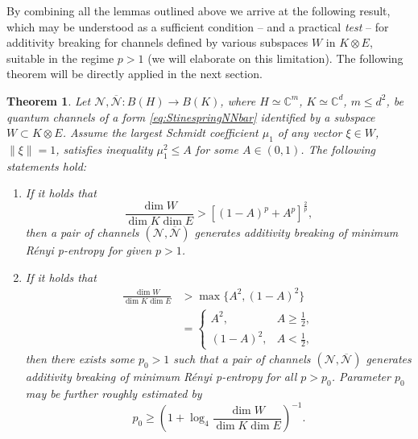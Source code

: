 \documentclass[reqno]{amsart}
\theoremstyle{plain}
\newtheorem{theorem}{Theorem}
\theoremstyle{note}
\newcommand{\complexes}{\mathbb{C}}
\begin{document}
By combining all the lemmas outlined above we arrive at the following result, which may be understood as a sufficient condition -- and a practical \emph{test} -- for additivity breaking for channels defined by various subspaces $W$ in $K \otimes E$, suitable in the regime $p > 1$ (we will elaborate on this limitation). The following theorem will be directly applied in the next section.

\begin{theorem}\label{thm:TheTheorem2}
Let $\mathcal{N}, \overline{\mathcal{N}} : B(H) \to B(K)$, where $H\simeq\complexes^m$, $K\simeq\complexes^d$, $m\leqslant d^2$, be quantum channels of a form \eqref{eq:StinespringNNbar} identified by a subspace $W\subset K \otimes E$. Assume the largest Schmidt coefficient $\mu_1$ of any vector $\xi \in W$, $\| \xi \| = 1$, satisfies inequality $\mu_{1}^{2} \leqslant A$ for some $A \in (0,1)$. The following statements hold:
\begin{enumerate}
    \item \label{item:TheTheorem2item1} If it holds that
\begin{equation}\label{eq:BreakingInequality}
    \frac{\dim{W}}{\dim{K}\dim{E}} > \left[ (1-A)^p + A^p \right]^{\frac{2}{p}},
\end{equation}
then a pair of channels $(\mathcal{N},\overline{\mathcal{N}})$ generates additivity breaking of minimum R\'{e}nyi \textit{p}-entropy for given $p > 1$.
\item \label{item:TheTheorem2item2} If it holds that
\begin{align}\label{eq:Limitation}
    \frac{\dim{W}}{\dim{K}\dim{E}} &> \max{\{A^2 , (1-A)^2\}} \\
    &= \begin{cases} A^2, & A \geqslant \frac{1}{2}, \\ (1-A)^2, & A < \frac{1}{2}, \end{cases} \nonumber
\end{align}
then there exists some $p_0 > 1$ such that a pair of channels $(\mathcal{N},\overline{\mathcal{N}})$ generates additivity breaking of minimum R\'{e}nyi \textit{p}-entropy for all $p > p_0$. Parameter $p_0$ may be further roughly estimated by
\begin{equation}\label{eq:Theorem2p0Bound}
    p_0 \geqslant \left( 1 + \log_{4}{\frac{\dim{W}}{\dim{K}\dim{E}}}\right)^{-1}.
\end{equation}
\end{enumerate}
\end{theorem}
\end{document}
